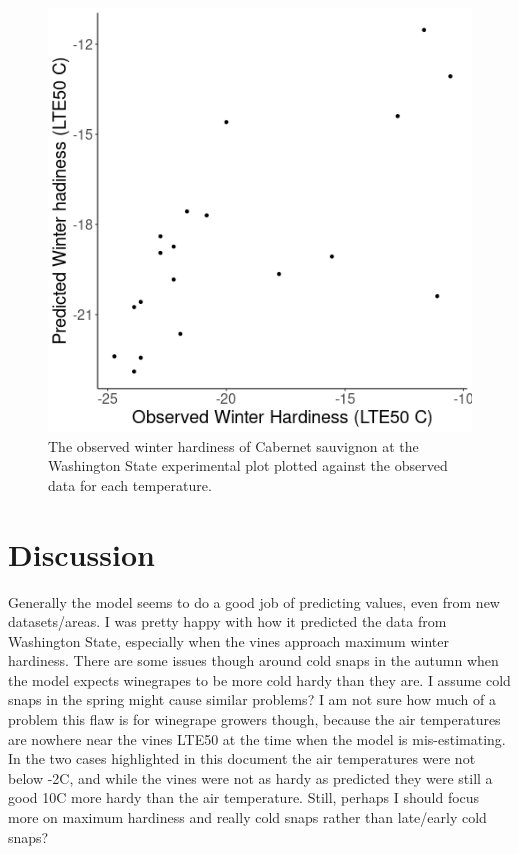 \documentclass[11pt,letter]{article}
\begin{document}
\begin{figure}
  \includegraphics[scale = 0.75]{WashingtonPrediction2.png}
  \caption{The observed winter hardiness of Cabernet sauvignon at the Washington State experimental plot plotted against the observed data for each temperature. }
  \label{fig:WashingtonPredictionyy}
\end{figure}

\section{Discussion}

Generally the model seems to do a good job of predicting values, even from new datasets/areas. I was pretty happy with how it predicted the data from Washington State, especially when the vines approach maximum winter hardiness. There are some issues though around cold snaps in the autumn when the model expects winegrapes to be more cold hardy than they are. I assume cold snaps in the spring might cause similar problems? I am not sure how much of a problem this flaw is for winegrape growers though, because the air temperatures are nowhere near the vines LTE50 at the time when the model is mis-estimating. In the two cases highlighted in this document the air temperatures were not below -2\textdegree C, and while the vines were not as hardy as predicted they were still a good 10\textdegree C more hardy than the air temperature. Still, perhaps I should focus more on maximum hardiness and really cold snaps rather than late/early cold snaps? \\
\end{document}
